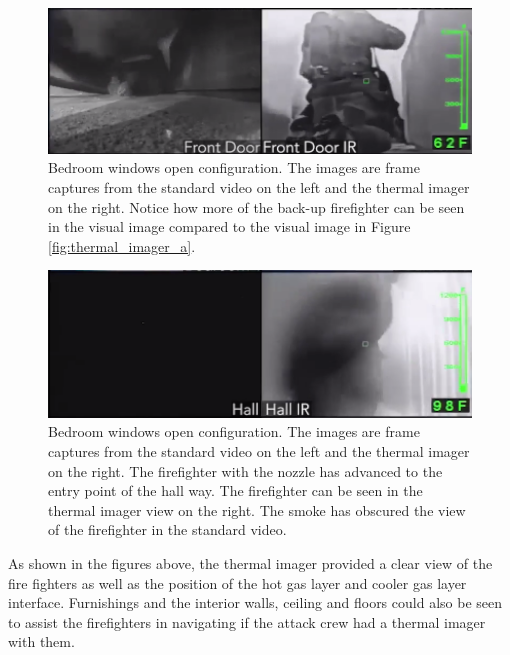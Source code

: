 \documentclass[12pt,oneside]{book}
\begin{document}
\begin{figure}[H]
\centering
\includegraphics[width=1.0\textwidth]{../0_Images/Tactical_Considerations/Thermal_Imager/Exp14FDpair.png}
\caption[Thermal Imager E]{Bedroom windows open configuration.  The images are frame captures from the standard video on the left and the thermal imager on the right.  Notice how more of the back-up firefighter can be seen in the visual image compared to the visual image in Figure \ref{fig:thermal_imager_a}.}
\label{fig:thermal_imager_e}
\end{figure}

\begin{figure}[H]
\centering
\includegraphics[width=1.0\textwidth]{../0_Images/Tactical_Considerations/Thermal_Imager/Exp14Hallpair.png}
\caption[Thermal Imager F]{Bedroom windows open configuration. The images are frame captures from the standard video on the left and the thermal imager on the right. The firefighter with the nozzle has advanced to the entry point of the hall way. The firefighter can be seen in the thermal imager view on the right. The smoke has obscured the view of the firefighter in the standard video.}
\label{fig:thermal_imager_f}
\end{figure}

As shown in the figures above, the thermal imager provided a clear view of the fire fighters as well as the position of the hot gas layer and cooler gas layer interface. Furnishings and the interior walls, ceiling and floors could also be seen to assist the firefighters in navigating if the attack crew had a thermal imager with them.  
\end{document}
